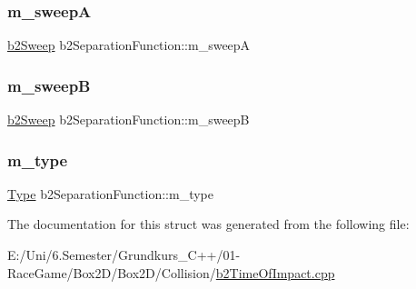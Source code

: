 \mbox{\label{structb2_separation_function_a46b838a661baa40cde771b779c2ff341}} 
\subsubsection{\texorpdfstring{m\_sweepA}{m\_sweepA}}
{\footnotesize\ttfamily \mbox{\hyperlink{structb2_sweep}{b2\+Sweep}} b2\+Separation\+Function\+::m\+\_\+sweepA}

\mbox{\label{structb2_separation_function_a11ba433f6e524fb92390bd8b4dd376b6}} 
\subsubsection{\texorpdfstring{m\_sweepB}{m\_sweepB}}
{\footnotesize\ttfamily \mbox{\hyperlink{structb2_sweep}{b2\+Sweep}} b2\+Separation\+Function\+::m\+\_\+sweepB}

\mbox{\label{structb2_separation_function_a51075eff2de404a1d82eee831fdfd4af}} 
\subsubsection{\texorpdfstring{m\_type}{m\_type}}
{\footnotesize\ttfamily \mbox{\hyperlink{structb2_separation_function_a8c1446894223e9b6c80dc4d7230141a4}{Type}} b2\+Separation\+Function\+::m\+\_\+type}



The documentation for this struct was generated from the following file\+:\begin{DoxyCompactItemize}
\item 
E\+:/\+Uni/6.\+Semester/\+Grundkurs\+\_\+\+C++/01-\/\+Race\+Game/\+Box2\+D/\+Box2\+D/\+Collision/\mbox{\hyperlink{b2_time_of_impact_8cpp}{b2\+Time\+Of\+Impact.\+cpp}}\end{DoxyCompactItemize}
